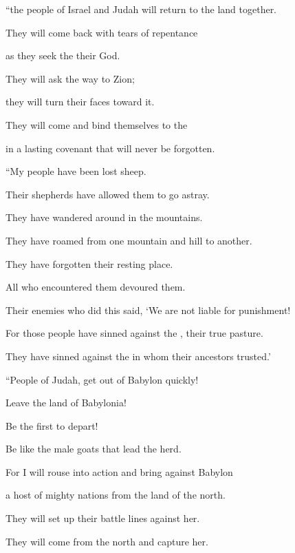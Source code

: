 {\par }{\Q “the people of
Israel
and Judah
will return
to the land together.
\par }{\Q They will come back
with tears
of repentance
\par }{\Q as they seek
the
{}
their God.
\par }{\Q {}They will ask
the way
to Zion;
\par }{\Q they will turn
their faces
toward it.
\par }{\Q They will come
and bind
themselves to
the {}
\par }{\Q in a lasting
covenant
that will never
be forgotten.
\par }{\Q {}“My people
have been
lost
sheep.
\par }{\Q Their shepherds
have allowed them to go astray.
\par }{\Q They have wandered around
in the mountains.
\par }{\Q They have roamed from
one mountain
and hill
to
another.

\par }{\Q They have forgotten
their resting place.
\par }{\Q {}All
who encountered
them devoured
them.
\par }{\Q Their enemies
who did this said,
‘We are not
liable
for punishment!
\par }{\Q For those
people have sinned
against the
{}, their true pasture.
\par }{\Q They have sinned against the
{}
in whom their ancestors
trusted.’
\par }{\Q {}“People of Judah,
get
out of Babylon
quickly!
\par }{\Q Leave the land
of Babylonia!

\par }{\Q Be
the first to depart!

\par }{\Q Be like
the male goats
that lead
the herd.
\par }{\Q {}For
I
will rouse
into action
and bring
against
Babylon
\par }{\Q a host
of mighty
nations
from the land
of the north.
\par }{\Q They will set up their battle lines
against her.
\par }{\Q They will come from
the north
and capture
her.

}
